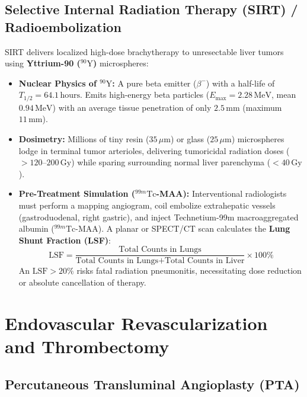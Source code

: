 \documentclass[11pt,a4paper]{article}
\begin{document}
\subsection{Selective Internal Radiation Therapy (SIRT) / Radioembolization}

SIRT delivers localized high-dose brachytherapy to unresectable liver tumors using \textbf{Yttrium-90 ($^{90}\text{Y}$)} microspheres:
\begin{itemize}[leftmargin=*]
    \item \textbf{Nuclear Physics of $^{90}\text{Y}$:} A pure beta emitter ($\beta^-$) with a half-life of $T_{1/2} = 64.1\,\text{hours}$. Emits high-energy beta particles ($E_{\text{max}} = 2.28\,\text{MeV}$, mean $0.94\,\text{MeV}$) with an average tissue penetration of only $2.5\,\text{mm}$ (maximum $11\,\text{mm}$).
    \item \textbf{Dosimetry:} Millions of tiny resin ($35\,\mu\text{m}$) or glass ($25\,\mu\text{m}$) microspheres lodge in terminal tumor arterioles, delivering tumoricidal radiation doses ($> 120\text{--}200\,\text{Gy}$) while sparing surrounding normal liver parenchyma ($< 40\,\text{Gy}$).
    \item \textbf{Pre-Treatment Simulation ($^{99m}\text{Tc}$-MAA):} Interventional radiologists must perform a mapping angiogram, coil embolize extrahepatic vessels (gastroduodenal, right gastric), and inject Technetium-99m macroaggregated albumin ($^{99m}\text{Tc}$-MAA). A planar or SPECT/CT scan calculates the \textbf{Lung Shunt Fraction (LSF)}:
    \begin{equation}
        \text{LSF} = \frac{\text{Total Counts in Lungs}}{\text{Total Counts in Lungs} + \text{Total Counts in Liver}} \times 100\%
    \end{equation}
    An $\text{LSF} > 20\%$ risks fatal radiation pneumonitis, necessitating dose reduction or absolute cancellation of therapy.
\end{itemize}

\newpage
\section{Endovascular Revascularization and Thrombectomy}

\subsection{Percutaneous Transluminal Angioplasty (PTA)}
\end{document}
